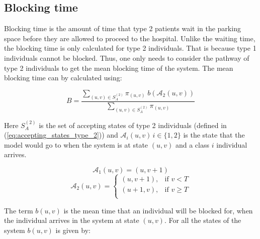 \subsection{Blocking time}\label{sec:blocking_time}


Blocking time is the amount of time that type 2 patients wait in the parking 
space before they are allowed to proceed to the hospital.
Unlike the waiting time, the blocking time is only calculated for type 2 
individuals.  
That is because type 1 individuals cannot be blocked. 
Thus, one only needs to consider the pathway of type 2 individuals to get the 
mean blocking time of the system. 
The mean blocking time can by calculated using:

\begin{equation}\label{eq:algebraic_blocking_time}
    B = \frac{\sum_{(u,v) \in S_A^{(2)}} \pi_{(u,v)} \; 
    b(\mathcal{A}_2(u,v))}{\sum_{(u,v) \in S_A^{(2)}} \pi_{(u,v)}}
\end{equation}

Here \(S_A^{(2)}\) is the set of accepting states of type 2 individuals (defined
in (\ref{eq:accepting_states_type_2})) and \(\mathcal{A}_i(u,v) \, i \in 
\{1, 2\} \) is the state that the model would go to when the system is at state 
\( (u,v) \) and a class \(i\) individual arrives. 

\begin{equation}\label{eq:arriving_state_class_1}
    \mathcal{A}_1(u,v) = (u, v + 1)
\end{equation}
\begin{equation}\label{eq:arriving_state_class_2}
    \mathcal{A}_2(u,v) = 
    \begin{cases}
        (u, v + 1), & \text{if } v < T \\
        (u + 1, v), & \text{if } v \geq T \\
    \end{cases}
\end{equation}

The term \(b(u,v)\) is the mean time that an individual will be blocked for, 
when the individual arrives in the system at state \((u,v)\). 
For all the states of the system \(b(u,v)\) is given by:

